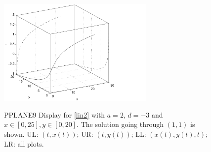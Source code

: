 \documentclass{ximera}
\begin{document}
{\begin{figure}[htb]
{     \includegraphics[width=3.0in]{../figures/plotall.pdf}}
     \caption{{\sf PPLANE9 Display} for \protect\eqref{lin2} with
             $a=2$, $d=-3$ and $x\in [0,25], y\in [0,20]$. The solution
             going through $(1,1)$ is shown. UL: $(t,x(t))$;
	UR: $(t,y(t))$; LL: $(x(t),y(t),t)$; LR: all plots.}
     \label{plotall}
\end{figure}
}



\end{document}
